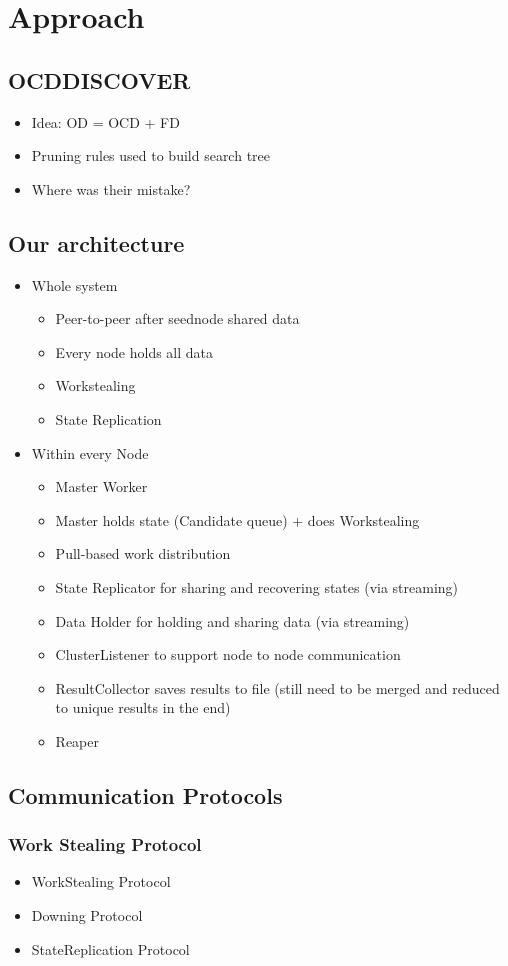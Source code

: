 
\section{Approach}\label{sec:approach}
 
\subsection{OCDDISCOVER}
\begin{itemize}
	\item Idea: OD = OCD + FD
	\item Pruning rules used to build search tree
	\item Where was their mistake?
\end{itemize}

\subsection{Our architecture}
\begin{itemize}
	\item Whole system
	\begin{itemize}
		\item Peer-to-peer after seednode shared data
		\item Every node holds all data
		\item Workstealing
		\item State Replication
	\end{itemize}
	\item Within every Node
	\begin{itemize}
		\item Master Worker
		\item Master holds state (Candidate queue) + does Workstealing
		\item Pull-based work distribution
		\item State Replicator for sharing and recovering states (via streaming)
		\item Data Holder for holding and sharing data (via streaming)
		\item ClusterListener to support node to node communication
		\item ResultCollector saves results to file (still need to be merged and reduced to unique results in the end)
		\item Reaper
	\end{itemize}
\end{itemize}
\subsection{Communication Protocols}
\subsubsection{Work Stealing Protocol}
\begin{itemize}
	\item WorkStealing Protocol
	\item Downing Protocol
	\item StateReplication Protocol

  	
  \end{itemize}